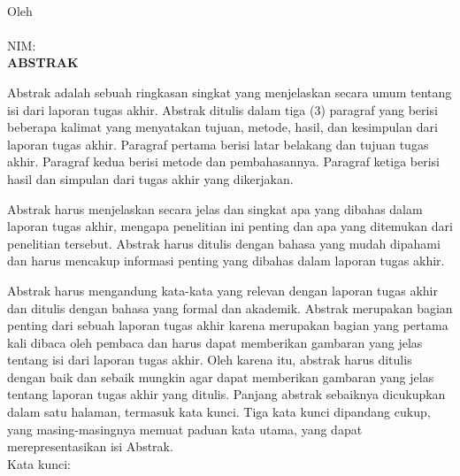
\clearpage
{}
{}
\begin{center}
    \textbf{\large{\judulid}}\\[0.5cm]
    Oleh\\
    \penulis\\
    NIM: \nim\\[2em]
    \textbf{ABSTRAK}\\[0.5cm]
\end{center}

Abstrak adalah sebuah ringkasan singkat yang menjelaskan secara umum tentang isi dari laporan tugas akhir. Abstrak ditulis dalam tiga (3) paragraf yang berisi beberapa kalimat yang menyatakan tujuan, metode, hasil, dan kesimpulan dari laporan tugas akhir. Paragraf pertama berisi latar belakang dan tujuan tugas akhir. Paragraf kedua berisi metode dan pembahasannya. Paragraf ketiga berisi hasil dan simpulan dari tugas akhir yang dikerjakan.

Abstrak harus menjelaskan secara jelas dan singkat apa yang dibahas dalam laporan tugas akhir, mengapa penelitian ini penting dan apa yang ditemukan dari penelitian tersebut. Abstrak harus ditulis dengan bahasa yang mudah dipahami dan harus mencakup informasi penting yang dibahas dalam laporan tugas akhir. 

Abstrak harus mengandung kata-kata yang relevan dengan laporan tugas akhir dan ditulis dengan bahasa yang formal dan akademik. Abstrak merupakan bagian penting dari sebuah laporan tugas akhir karena merupakan bagian yang pertama kali dibaca oleh pembaca dan harus dapat memberikan gambaran yang jelas tentang isi dari laporan tugas akhir. Oleh karena itu, abstrak harus ditulis dengan baik dan sebaik mungkin agar dapat memberikan gambaran yang jelas tentang laporan tugas akhir yang ditulis. Panjang abstrak sebaiknya dicukupkan dalam satu halaman, termasuk kata kunci. Tiga kata kunci dipandang cukup, yang masing-masingnya memuat paduan kata utama, yang dapat merepresentasikan isi Abstrak.\\[0.6cm]

\noindent Kata kunci: \katakunci